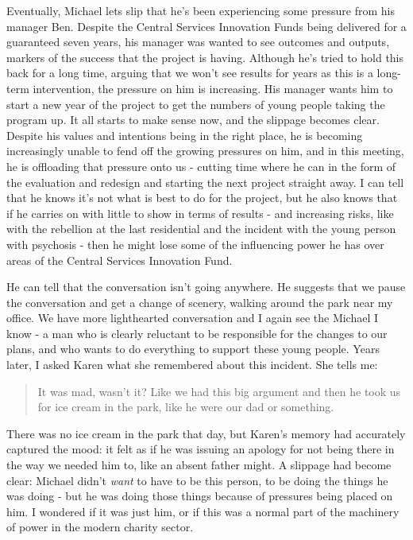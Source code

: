 Eventually, Michael lets slip that he's been experiencing some pressure from his manager Ben. Despite the Central Services Innovation Funds being delivered for a guaranteed seven years, his manager was wanted to see outcomes and outputs, markers of the success that the project is having. Although he's tried to hold this back for a long time, arguing that we won't see results for years as this is a long-term intervention, the pressure on him is increasing. His manager wants him to start a new year of the project to get the numbers of young people taking the program up. It all starts to make sense now, and the slippage becomes clear. Despite his values and intentions being in the right place, he is becoming increasingly unable to fend off the growing pressures on him, and in this meeting, he is offloading that pressure onto us - cutting time where he can in the form of the evaluation and redesign and starting the next project straight away. I can tell that he knows it's not what is best to do for the project, but he also knows that if he carries on  with little to show in terms of results - and increasing risks, like with the rebellion at the last residential and the incident with the young person with psychosis - then he might lose some of the influencing power he has over areas of the Central Services Innovation Fund.

He can tell that the conversation isn't going anywhere. He suggests that we pause the conversation and get a change of scenery, walking around the park near my office. We have more lighthearted conversation and I again see the Michael I know - a man who is clearly reluctant to be responsible for the changes to our plans, and who wants to do everything to support these young people. Years later, I asked Karen what she remembered about this incident. She tells me:
\begin{quote}
It was mad, wasn't it? Like we had this big argument and then he took us for ice cream in the park, like he were our dad or something.
\end{quote}

There was no ice cream in the park that day, but Karen's memory had accurately captured the mood: it felt as if he was issuing an apology for not being there in the way we needed him to, like an absent father might. A slippage had become clear: Michael didn't \textit{want} to have to be this person, to be doing the things he was doing - but he was doing those things because of pressures being placed on him. I wondered if it was just him, or if this was a normal part of the machinery of power in the modern charity sector.

